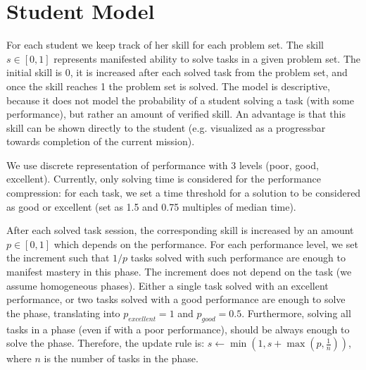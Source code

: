 \section{Student Model}
\label{sec:robomission.student}

For each student we keep track of her skill for each problem set. %
The skill $s \in [0, 1]$ represents manifested ability to solve tasks in
a given problem set. The initial skill is 0, it is increased after each solved
task from the problem set, and once the skill reaches 1 the problem set is solved.
The model is descriptive, because it does not model the probability of
a student solving a task (with some performance), but rather an amount
of verified skill.
An advantage is that this skill can be shown directly to the student
(e.g. visualized as a progressbar towards completion of the current mission).

We use discrete representation of performance with 3 levels (poor, good,
excellent). Currently, only solving time is considered for the performance
compression: for each task, we set a time threshold for a solution to be
considered as good or excellent
(set as 1.5 and 0.75 multiples of median time).

After each solved task session, the corresponding skill is increased by
an amount $p \in [0, 1]$ which depends on the performance.
For each performance level, we set the increment such that $1/p$ tasks solved
with such performance are enough to manifest mastery in this phase.
The increment does not depend on the task (we assume homogeneous phases).
Either a single task solved with an excellent performance, or two
tasks solved with a good performance are enough to solve the phase,
translating into $p_{excellent} = 1$ and $p_{good} = 0.5$.
Furthermore, solving all tasks in a phase (even if with a poor performance),
should be always enough to solve the phase.
Therefore, the update rule is:
$s \leftarrow \min(1, s + \max(p, \frac{1}{n}))$,
where $n$ is the number of tasks in the phase.

